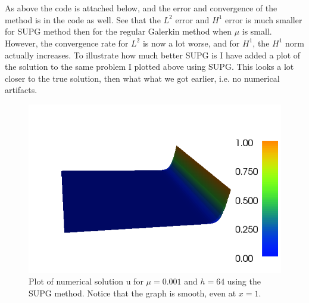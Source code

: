 \documentclass[11pt,a4paper]{report}
\begin{document}
\\
\\
As above the code is attached below, and the error and convergence of the method is in the code as well. See that the $L^2$ error and $H^1$ error is much smaller for SUPG method then for the regular Galerkin method when $\mu$ is small. However, the convergence rate for $L^2$ is now a lot worse, and for $H^1$, the $H^1$ norm actually increases. To illustrate how much better SUPG is I have added a plot of the solution to the same problem I plotted above using SUPG. This looks a lot closer to the true solution, then what what we got earlier, i.e. no numerical artifacts. 
\begin{figure}
  \includegraphics[width=\linewidth]{dolfin_plot_3.png}
  \caption{Plot of numerical solution u for $\mu=0.001$ and $h=64$ using the SUPG method. Notice that the graph is smooth, even at $x=1$. }
  \label{Fig 4}
\end{figure}  
\end{document}
